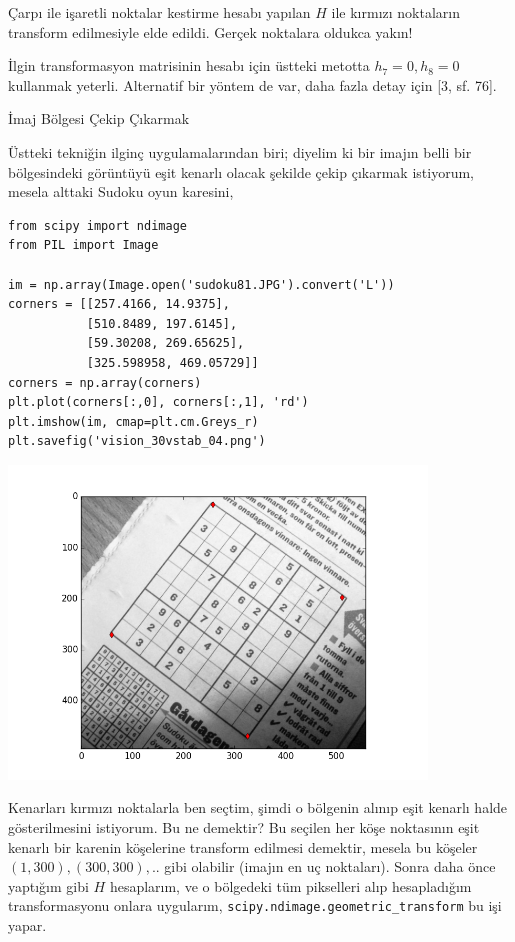 \documentclass[12pt,fleqn]{article}\usepackage{../../common}
\begin{document}
Çarpı ile işaretli noktalar kestirme hesabı yapılan $H$ ile kırmızı
noktaların transform edilmesiyle elde edildi. Gerçek noktalara oldukca
yakın! 

İlgin transformasyon matrisinin hesabı için üstteki metotta $h_7=0,h_8=0$
kullanmak yeterli. Alternatif bir yöntem de var, daha fazla detay için [3,
sf. 76]. 

İmaj Bölgesi Çekip Çıkarmak

Üstteki tekniğin ilginç uygulamalarından biri; diyelim ki bir imajın belli
bir bölgesindeki görüntüyü eşit kenarlı olacak şekilde çekip çıkarmak
istiyorum, mesela alttaki Sudoku oyun karesini,

\begin{verbatim}
from scipy import ndimage
from PIL import Image

im = np.array(Image.open('sudoku81.JPG').convert('L'))
corners = [[257.4166, 14.9375], 
           [510.8489, 197.6145], 
           [59.30208, 269.65625], 
           [325.598958, 469.05729]]
corners = np.array(corners)
plt.plot(corners[:,0], corners[:,1], 'rd')
plt.imshow(im, cmap=plt.cm.Greys_r)
plt.savefig('vision_30vstab_04.png')
\end{verbatim}

\includegraphics[width=30em]{vision_30vstab_04.png}

Kenarları kırmızı noktalarla ben seçtim, şimdi o bölgenin alınıp eşit
kenarlı halde gösterilmesini istiyorum. Bu ne demektir? Bu seçilen her köşe
noktasının eşit kenarlı bir karenin köşelerine transform edilmesi demektir,
mesela bu köşeler $(1,300),(300,300),..$ gibi olabilir (imajın en uç
noktaları). Sonra daha önce yaptığım gibi $H$ hesaplarım, ve o bölgedeki
tüm pikselleri alıp hesapladığım transformasyonu onlara uygularım,
\verb!scipy.ndimage.geometric_transform! bu işi yapar.
\end{document}
